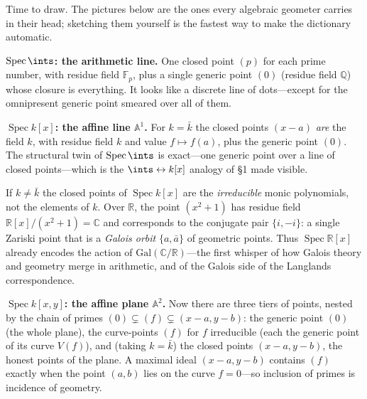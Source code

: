 \documentclass[11pt]{article}
\DeclareMathOperator{\Spec}{Spec}
\begin{document}
Time to draw. The pictures below are the ones every algebraic geometer carries in their head;
sketching them yourself is the fastest way to make the dictionary automatic.

\textbf{$\Spec\ints$: the arithmetic line.} One closed point $(p)$ for each prime number, with
residue field $\mathbb{F}_p$, plus a single generic point $(0)$ (residue field $\mathbb{Q}$)
whose closure is everything. It looks like a discrete line of dots---except for the omnipresent
generic point smeared over all of them.

\begin{center}
\end{center}

\textbf{$\Spec k[x]$: the affine line $\mathbb{A}^1$.} For $k=\bar k$ the closed points $(x-a)$
\emph{are} the field $k$, with residue field $k$ and value $f\mapsto f(a)$, plus the generic
point $(0)$. The structural twin of $\Spec\ints$ is exact---one generic point over a line of
closed points---which is the $\ints\leftrightarrow k[x]$ analogy of \S1 made visible.

\begin{reemark}
If $k\neq\bar k$ the closed points of $\Spec k[x]$ are the \emph{irreducible} monic
polynomials, not the elements of $k$. Over $\mathbb{R}$, the point $(x^2+1)$ has residue field
$\mathbb{R}[x]/(x^2+1)=\mathbb{C}$ and corresponds to the conjugate pair $\{i,-i\}$: a single
Zariski point that is a \emph{Galois orbit} $\{a,\bar a\}$ of geometric points. Thus
$\Spec\mathbb{R}[x]$ already encodes the action of $\mathrm{Gal}(\mathbb{C}/\mathbb{R})$---the
first whisper of how Galois theory and geometry merge in arithmetic, and of the Galois side of
the Langlands correspondence.
\end{reemark}

\textbf{$\Spec k[x,y]$: the affine plane $\mathbb{A}^2$.} Now there are three tiers of points,
nested by the chain of primes $(0)\subsetneq(f)\subsetneq(x-a,y-b)$: the generic point $(0)$
(the whole plane), the curve-points $(f)$ for $f$ irreducible (each the generic point of its
curve $V(f)$), and (taking $k=\bar k$) the closed points $(x-a,y-b)$, the honest points of the
plane. A maximal ideal $(x-a,y-b)$ contains $(f)$ exactly when the point $(a,b)$ lies on the
curve $f=0$---so inclusion of primes is incidence of geometry.
\end{document}
